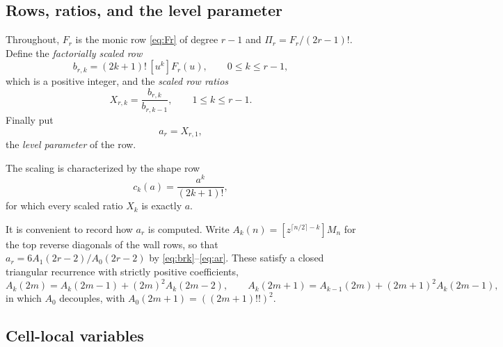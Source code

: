 \documentclass[11pt,a4paper]{article}
\theoremstyle{plain}
\theoremstyle{definition}
\theoremstyle{remark}
\begin{document}
\subsection{Rows, ratios, and the level parameter}

Throughout, $F_r$ is the monic row \eqref{eq:Fr} of degree $r-1$ and
$\Pi_r=F_r/(2r-1)!$. Define the \emph{factorially scaled row}
\begin{equation}\label{eq:brk}
  b_{r,k}=(2k+1)!\,[u^k]F_r(u),\qquad 0\le k\le r-1,
\end{equation}
which is a positive integer, and the \emph{scaled row ratios}
\begin{equation}\label{eq:Xrk}
  X_{r,k}=\frac{b_{r,k}}{b_{r,k-1}},\qquad 1\le k\le r-1 .
\end{equation}
Finally put
\begin{equation}\label{eq:ar}
  a_r=X_{r,1},
\end{equation}
the \emph{level parameter} of the row.

The scaling is characterized by the shape row
\begin{equation}\label{eq:shape}
  c_k(a)=\frac{a^k}{(2k+1)!},
\end{equation}
for which every scaled ratio $X_k$ is exactly $a$.

It is convenient to record how $a_r$ is computed. Write
$A_k(n)=[z^{\lceil n/2\rceil-k}]M_n$ for the top reverse diagonals of the wall
rows, so that $a_r=6A_1(2r-2)/A_0(2r-2)$ by \eqref{eq:brk}--\eqref{eq:ar}. These
satisfy a closed triangular recurrence with strictly positive coefficients,
\begin{equation}\label{eq:revdiag}
  A_k(2m)=A_k(2m-1)+(2m)^2A_k(2m-2),
  \qquad
  A_k(2m+1)=A_{k-1}(2m)+(2m+1)^2A_k(2m-1),
\end{equation}
in which $A_0$ decouples, with $A_0(2m+1)=((2m+1)!!)^2$.

\subsection{Cell-local variables}
\end{document}

